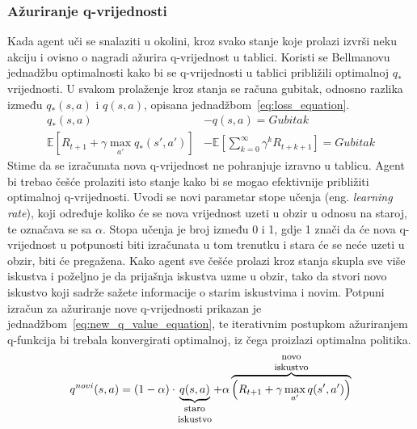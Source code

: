 \subsubsection{Ažuriranje q-vrijednosti}
Kada agent uči se snalaziti u okolini, kroz svako stanje koje prolazi izvrši neku akciju i ovisno o nagradi ažurira q-vrijednost u tablici. Koristi se Bellmanovu jednadžbu optimalnosti kako bi se q-vrijednosti u tablici približili optimalnoj $q_*$ vrijednosti. U svakom prolaženje kroz stanja se računa gubitak, odnosno razlika između $q_*(s,a)$ i $q(s, a)$, opisana jednadžbom~\ref{eq:loss_equation}. 
\begin{equation}\label{eq:loss_equation}
\begin{split}
q_*(s, a) &- q(s, a) = Gubitak \\
\mathbb{E}\left[R_{t+1} + \gamma\max_{a'}q_*(s', a')\right] &- 
\mathbb{E}\left[\sum_{k=0}^{\infty}\gamma^kR_{t+k+1}\right] = Gubitak
\end{split}
\end{equation}
Stime da se izračunata nova q-vrijednost ne pohranjuje izravno u tablicu. Agent bi trebao češće prolaziti isto stanje kako bi se mogao efektivnije približiti optimalnoj q-vrijednosti. Uvodi se novi parametar stope učenja (eng. \textit{learning rate}), koji određuje koliko će se nova vrijednost uzeti u obzir u odnosu na staroj, te označava se sa  $\alpha$. Stopa učenja je broj između 0 i 1, gdje 1 znači da će nova q-vrijednost u potpunosti biti izračunata u tom trenutku i stara će se neće uzeti u obzir, biti će pregažena. Kako agent sve češće prolazi kroz stanja skupla sve više iskustva i poželjno je da prijašnja iskustva uzme u obzir, tako da stvori novo iskustvo koji sadrže sažete informacije o starim iskustvima i novim. Potpuni izračun za ažuriranje nove q-vrijednosti prikazan je jednadžbom~\ref{eq:new_q_value_equation}, te iterativnim postupkom ažuriranjem q-funkcija bi trebala konvergirati optimalnoj, iz čega proizlazi optimalna politika.
\begin{equation}\label{eq:new_q_value_equation}
q^{novi}(s, a) = (1 - \alpha) \cdot \underbrace{q(s, a)}_{\parbox{3em}{\footnotesize\centering staro iskustvo}} + \alpha
\overbrace{\left(R_{t+1} + \gamma\max_{a'}q(s', a')\right)}^{\parbox{3em}{\footnotesize\centering novo iskustvo}}
\end{equation}

